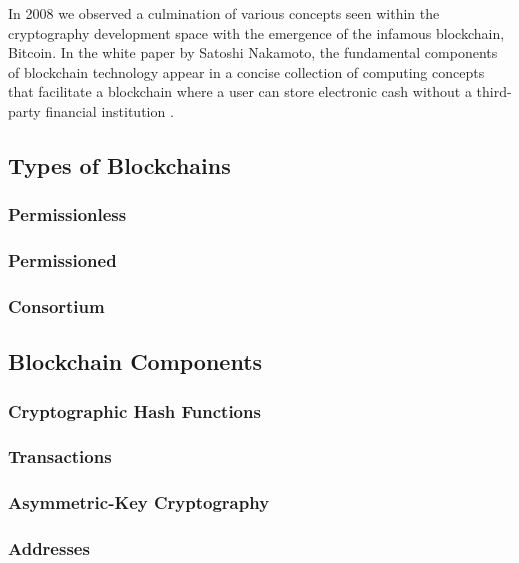 In 2008 we observed a culmination of various concepts seen within the cryptography development space with the emergence of the infamous blockchain, Bitcoin. In the white paper by Satoshi Nakamoto, the fundamental components of blockchain technology appear in a concise collection of computing concepts that facilitate a blockchain where a user can store electronic cash without a third-party financial institution \autocite{nakamotoBitcoinPeertoPeerElectronic}. 

\subsection{Types of Blockchains}

\subsubsection{Permissionless}

\subsubsection{Permissioned}

\subsubsection{Consortium}

\subsection{Blockchain Components}

\subsubsection{Cryptographic Hash Functions}

\subsubsection{Transactions}

\subsubsection{Asymmetric-Key Cryptography}

\subsubsection{Addresses}

